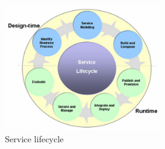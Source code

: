 \documentclass[12pt]{article}
\begin{document}
\begin{figure}[here!]
	\centering
	\includegraphics[width=0.6\textwidth]{images/scly.png}
	\caption{Service lifecycle \cite{slcmoracle}}
	\label{fig:Servicelifecycle}
	\end{figure}
	\FloatBarrier
	
\end{document}
